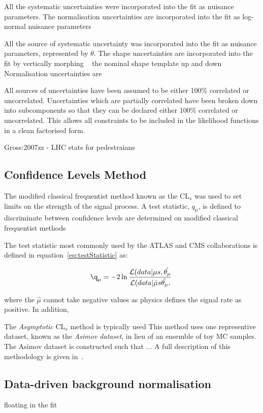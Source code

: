 All the systematic uncertainties were incorporated into the fit as nuisance parameters.
The normalisation uncertainties are incorporated into the fit as log-normal nuisance parameters

All the source of systematic uncertainty was incorporated into the fit as nuisance parameters, represented by $\theta$.
The shape uncertainties are incorporated into the fit by vertically morphing ~\cite{Baak:2014fta} the nominal shape template up and down 
Normalisation uncertainties are 

All sources of uncertainties have been assumed to be either 100\% correlated or uncorrelated.
Uncertainties which are partially correlated have been broken down into subcomponents so that they can be declared either 100\% correlated or uncorrelated.
This allows all constraints to be included in the likelihood functions in a clean factorised form. 

Gross:2007zz - LHC stats for pedestraians

\subsection{Confidence Levels Method}\label{subsec:CLs}
The modified classical frequentist method known as the CL$_{s}$ was used to set limits on the strength of the signal process.
A test statistic, $q_{\mu}$, is defined to discriminate between 
confidence levels are determined on modified classical frequentist methods 


The test statistic most commonly used by the ATLAS and CMS collaborations is defined in equation~\ref{eq:testStatistic} as:

\begin{equation}
\q_{\mu} =  -2 \ln \frac{ \mathcal{L}(data | \mu s , \hat{\theta_{\mu}}}{ \mathcal{L}(data | \hat{\mu} s \hat{\theta_{\mu}},  } \;
\label{eq:testStatistic}
\end{equation}

where the
$\hat{\mu}$ 
cannot take negative values as physics defines the signal rate as positive.
In addition, 


The \emph{Asymptotic} CL$_{s}$ method is typically used 
This method uses one representive dataset, known as the \emph{Asimov dataset}, in lieu of an ensemble of toy MC samples.
The Asimov dataset is constructed such that ...
A full description of this methodology is given in~\cite{Cowan:2010js}.

\subsection{Data-driven background normalisation}\label{subsec:combineNormalisation}
floating in the fit



